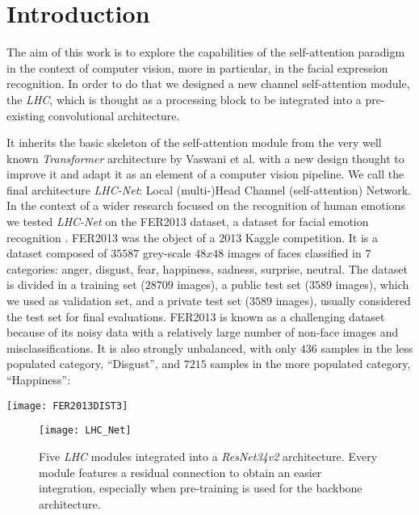 \documentclass[fleqn,10pt]{SelfArx}
\begin{document}
\flushbottom 

\maketitle 

\tableofcontents 

\thispagestyle{empty} 



\section*{Introduction} 


The aim of this work is to explore the capabilities of the self-attention paradigm in the context of computer vision, more in particular, in the facial expression recognition. In order to do that we designed a new channel self-attention module, the \textit{LHC}, which is thought as a processing block to be integrated into a pre-existing convolutional architecture. 

It inherits the basic skeleton of the self-attention module from the very well known \textit{Transformer} architecture by Vaswani et al. \cite{Transformer} with a new design thought to improve it and adapt it as an element of a computer vision pipeline. We call the final architecture \textit{LHC-Net}: Local (multi-)Head Channel (self-attention) Network.
In the context of a wider research focused on the recognition of human emotions we tested \textit{LHC-Net} on the FER2013 dataset, a dataset for facial emotion recognition \cite{FER2013}. FER2013 was the object of a 2013 Kaggle competition. It is a dataset composed of $35587$ grey-scale $48x48$ images of faces classified in $7$ categories: anger, disgust, fear, happiness, sadness, surprise, neutral. The dataset is divided in a training set ($28709$ images), a public test set ($3589$ images), which we used as validation set, and a private test set ($3589$ images), usually considered the test set for final evaluations. FER2013 is known as a challenging dataset because of its noisy data with a relatively large number of non-face images and misclassifications. It is also strongly unbalanced, with only $436$ samples in the less populated category, ``Disgust'', and $7215$ samples in the more populated category, ``Happiness'':

\noindent\texttt{[image: FER2013DIST3]}

\begin{figure*}[ht]\centering \texttt{[image: LHC\_Net]}
\caption{Five \textit{LHC} modules integrated into a \textit{ResNet34v2} architecture. Every module features a residual connection to obtain an easier integration, especially when pre-training is used for the backbone architecture.}
\end{figure*}
\end{document}
